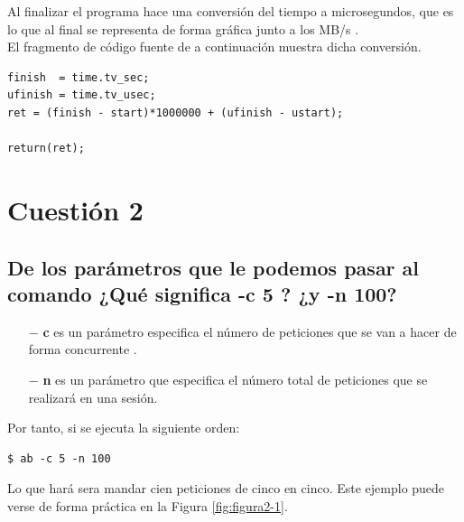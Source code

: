Al finalizar el programa hace una conversión del tiempo a microsegundos, que es lo que al final se representa de forma gráfica junto a los MB/s .
\\

El fragmento de código fuente de a continuación muestra dicha conversión.

\begin{lstlisting}[style=cmas]
finish  = time.tv_sec;
ufinish = time.tv_usec;
ret = (finish - start)*1000000 + (ufinish - ustart);

return(ret);
\end{lstlisting}
\newpage


\section{Cuestión 2}
\subsection{De los parámetros que le podemos pasar al comando ¿Qué
significa -c 5 ? ¿y -n 100?}

\begin{enumerate}
	\item[$ - $] \textbf{c} es un parámetro especifica el número de peticiones que se van a hacer de forma concurrente \cite{enlace4}. 
	\item[$ - $] \textbf{n} es un parámetro que especifica el número total de peticiones que se realizará en una sesión.
\end{enumerate}

Por tanto, si se ejecuta la siguiente orden:
\begin{lstlisting}[style=fich]
$ ab -c 5 -n 100
\end{lstlisting}
\vspace{-8pt}

Lo que hará sera mandar cien peticiones de cinco en cinco. Este ejemplo puede verse de forma práctica en la Figura \ref{fig:figura2-1}.


